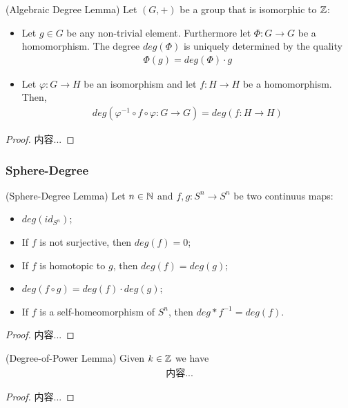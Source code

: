 \documentclass[Total.tex]{subfiles}
\begin{document}
				\begin{lemma}
					(Algebraic Degree Lemma) Let $(G,+)$ be a group that is isomorphic to $\mathbb{Z}$:
					\begin{itemize}
						\item Let $g\in G$ be any non-trivial element. Furthermore let $\Phi:G\rightarrow G$ be a homomorphism. The degree $deg(\Phi)$ is uniquely determined by the quality
						\begin{gather*}
							\Phi(g)=deg(\Phi)\cdot g
						\end{gather*}
						\item Let $\varphi:G\rightarrow H$ be an isomorphism and let $f:H\rightarrow H$ be a homomorphism. Then,
						\begin{gather*}
							deg(\varphi^{-1}\circ f\circ \varphi:G\rightarrow G)=deg(f:H\rightarrow H)
						\end{gather*}
					\end{itemize}
				\end{lemma}
				\begin{proof}
					内容...
				\end{proof}
				\subsubsection{Sphere-Degree}
				\begin{lemma}
					(Sphere-Degree Lemma) Let $n\in \mathbb{N}$ and $f,g:S^n\rightarrow S^n$ be two continuus maps:
					\begin{itemize}
						\item $deg(id_{S^n})$;
						\item If $f$ is not surjective, then $deg(f)=0$;
						\item If $f$ is homotopic to $g$, then $deg(f)=deg(g)$;
						\item $deg(f\circ g)=deg(f)\cdot deg(g)$;
						\item If $f$ is a self-homeomorphism of $S^n$, then $deg*f^{-1}=deg(f)$.
					\end{itemize}
				\end{lemma}
				\begin{proof}
					内容...
				\end{proof}
				
				\begin{lemma}
					(Degree-of-Power Lemma) Given $k\in \mathbb{Z}$ we have
					\begin{gather*}
						内容...
					\end{gather*}
				\end{lemma}
				\begin{proof}
					内容...
				\end{proof}
				
\end{document}
